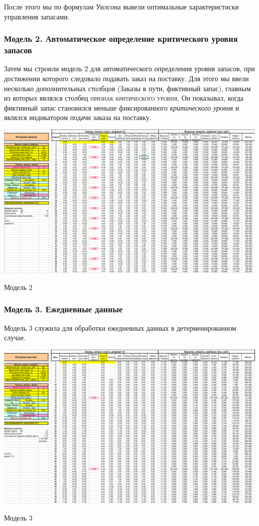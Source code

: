 \documentclass[aps,%
12pt,%
final,%
oneside,
onecolumn,%
musixtex, %
superscriptaddress,%
centertags]{article} %
\theoremstyle{plain}
\theoremstyle{definition}
\theoremstyle{remark}
\begin{document}
После этого мы по формулам Уилсона вывели оптимальные характеристиски управления запасами.

\subsubsection{Модель 2. Автоматическое определение критического уровня запасов}

Затем мы строили модель $2$ для автоматического определения уровня запасов, при достижении которого следовало подавать заказ на поставку. Для этого мы ввели несколько дополнительных столбцов (Заказы в пути, фиктивный запас), главным из которых являлся столбец \textsc{признак критического уровня}. Он показывал, когда фиктивный запас становился меньше фиксированного \textit{критического уровня} и являлся индикатором подачи заказа на поставку.

\begin{center}
  \includegraphics[scale=0.3]{images/4b.png}

  Модель 2
\end{center}

\subsubsection{Модель 3. Ежедневные данные}

Модель $3$ служила для обработки ежедневных данных в детерменированном случае.

\begin{center}
  \includegraphics[scale=0.3]{images/4c.png}

  Модель 3
\end{center}
\end{document}
